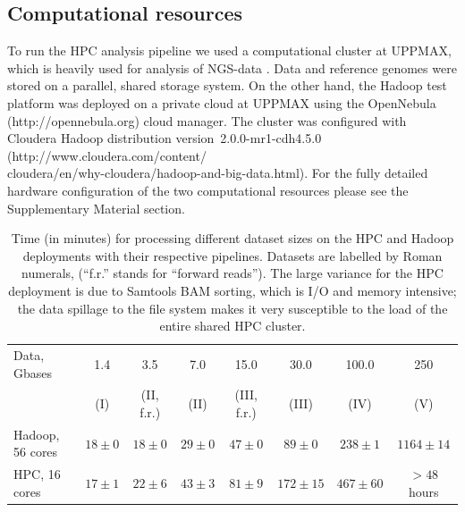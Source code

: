 \documentclass{bioinfo}
\begin{document}
\begin{methods}
\subsection*{Computational resources}
To run the HPC analysis pipeline we used a computational cluster at UPPMAX,
which is heavily used for analysis of NGS-data \citep{lampa}.
Data and reference genomes were stored on a parallel, shared storage system.
On the other hand, the Hadoop test platform was deployed on a private cloud at
UPPMAX using the OpenNebula (http://opennebula.org) cloud manager. The cluster was
configured with Cloudera Hadoop distribution version~2.0.0-mr1-cdh4.5.0 (http://www.cloudera.com/content/\\cloudera/en/why-cloudera/hadoop-and-big-data.html).
For the fully detailed hardware configuration of the two computational resources
please see the Supplementary Material section.


\end{methods}





\begin{table}
\small

\caption{%
	Time (in minutes) for processing different dataset sizes on the HPC and
	Hadoop deployments with their respective pipelines. Datasets are labelled by
	Roman numerals, (``f.r.'' stands for ``forward reads''). The large variance
	for the HPC deployment is due to Samtools BAM sorting, which is I/O and memory
	intensive; the data spillage to the file system makes it very susceptible to
	the load of the entire shared HPC cluster.
	}

\begin{center}
\begin{tabular}{l|c|c|c|c|c|c|c}

Data, Gbases		&	1.4	&	3.5		&	7.0		&	15.0		&	30.0		&	100.0	&	250 	\\
				&	(I)	&	(II, f.r.)	&	(II)		&	(III, f.r.)	&	(III)		&	(IV)		&	(V)\\
\hline
Hadoop, 56 cores		&	$18\pm0	$	&	$18\pm0	$	&	$29\pm0$	&	$47\pm0	$	&	$89\pm0$	&	$238\pm1$		&	$1164\pm14$\\
HPC, 16 cores	&	$17\pm1$	&	$22\pm6$	&	$43\pm3$	&	$81\pm9$	&	$172\pm15$		&	$467\pm60$	& $>48$ hours\\

\end{tabular}
\end{center}
\label{table:pipleline-timings}
\normalsize
\end{table}%
\end{document}

